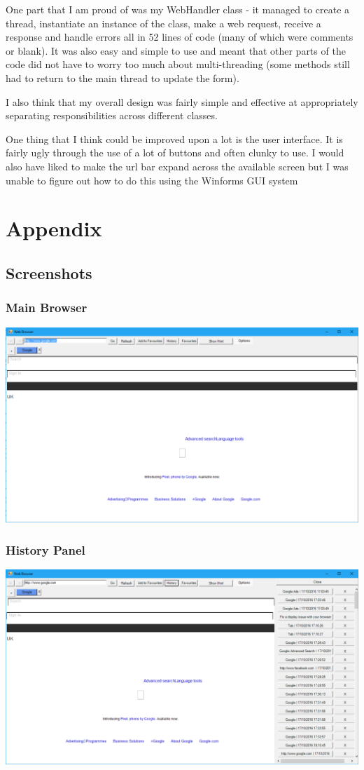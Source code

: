 \documentclass[11pt]{report}
\begin{document}
One part that I am proud of was my WebHandler class - it managed to create a thread, instantiate an instance of the class, make a web request, receive a response and handle errors all in 52 lines of code (many of which were comments or blank).  It was also easy and simple to use and meant that other parts of the code did not have to worry too much about multi-threading (some methods still had to return to the main thread to update the form).

I also think that my overall design was fairly simple and effective at appropriately separating responsibilities across different classes.

One thing that I think could be improved upon a lot is the user interface.  It is fairly ugly through the use of a lot of buttons and often clunky to use.   I would also have liked to make the url bar expand across the available screen but I was unable to figure out how to do this using the Winforms GUI system

\chapter{Appendix}
\section{Screenshots}
\subsection{Main Browser}
\includegraphics[scale=0.4]{browser.png}
\subsection{History Panel}
\includegraphics[scale=0.4]{history.png}
\end{document}
